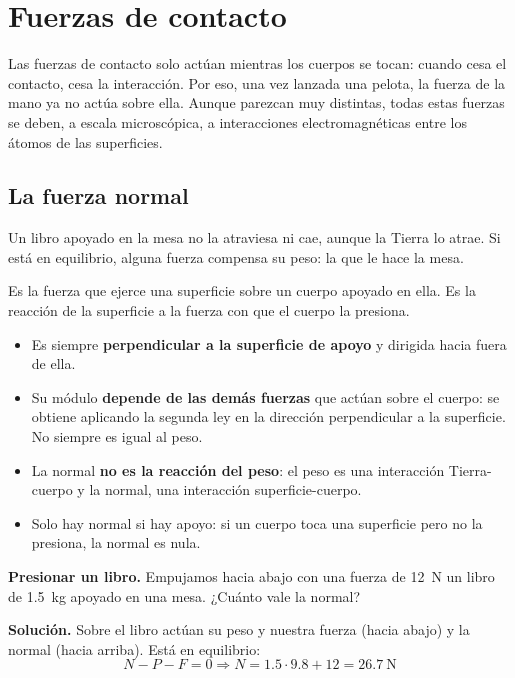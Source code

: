 \section{Fuerzas de contacto}\label{sec:ud11-contacto}

Las fuerzas de contacto solo actúan mientras los cuerpos se tocan: cuando cesa el contacto, cesa la interacción. Por eso, una vez
lanzada una pelota, la fuerza de la mano ya no actúa sobre ella. Aunque parezcan muy distintas, todas estas fuerzas se deben, a escala
microscópica, a interacciones electromagnéticas entre los átomos de las superficies.

\subsection{La fuerza normal}

Un libro apoyado en la mesa no la atraviesa ni cae, aunque la Tierra lo atrae. Si está en equilibrio, alguna fuerza compensa su peso:
la que le hace la mesa.

\begin{definition}
    Es la fuerza que ejerce una superficie sobre un cuerpo apoyado en ella. Es la reacción de la superficie a la fuerza con que el
    cuerpo la presiona.
\end{definition}

\begin{itemize}
    \item Es siempre \textbf{perpendicular a la superficie de apoyo} y dirigida hacia fuera de ella.
    \item Su módulo \textbf{depende de las demás fuerzas} que actúan sobre el cuerpo: se obtiene aplicando la segunda ley en la
    dirección perpendicular a la superficie. No siempre es igual al peso.
    \item La normal \textbf{no es la reacción del peso}: el peso es una interacción Tierra-cuerpo y la normal, una interacción
    superficie-cuerpo.
    \item Solo hay normal si hay apoyo: si un cuerpo toca una superficie pero no la presiona, la normal es nula.
\end{itemize}

\begin{example}
    \textbf{Presionar un libro.} Empujamos hacia abajo con una fuerza de \qty{12}{\newton} un libro de \qty{1.5}{\kg} apoyado en una
    mesa. ¿Cuánto vale la normal?

    \textbf{Solución.} Sobre el libro actúan su peso y nuestra fuerza (hacia abajo) y la normal (hacia arriba). Está en equilibrio:
    \[ N - P - F = 0 \Rightarrow N = \num{1.5} \cdot \num{9.8} + 12 = \qty{26.7}{\newton} \]
\end{example}

